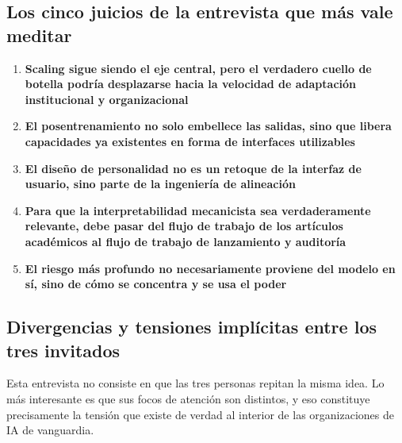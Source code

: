 \documentclass[a4paper]{article}
\begin{document}
\subsection{Los cinco juicios de la entrevista que más vale meditar}

\begin{enumerate}
    \item \textbf{Scaling sigue siendo el eje central, pero el verdadero cuello de botella podría desplazarse hacia la velocidad de adaptación institucional y organizacional}
    \item \textbf{El posentrenamiento no solo embellece las salidas, sino que libera capacidades ya existentes en forma de interfaces utilizables}
    \item \textbf{El diseño de personalidad no es un retoque de la interfaz de usuario, sino parte de la ingeniería de alineación}
    \item \textbf{Para que la interpretabilidad mecanicista sea verdaderamente relevante, debe pasar del flujo de trabajo de los artículos académicos al flujo de trabajo de lanzamiento y auditoría}
    \item \textbf{El riesgo más profundo no necesariamente proviene del modelo en sí, sino de cómo se concentra y se usa el poder}
\end{enumerate}

\subsection{Divergencias y tensiones implícitas entre los tres invitados}

Esta entrevista no consiste en que las tres personas repitan la misma idea. Lo más interesante es que sus focos de atención son distintos, y eso constituye precisamente la tensión que existe de verdad al interior de las organizaciones de IA de vanguardia.
\end{document}
